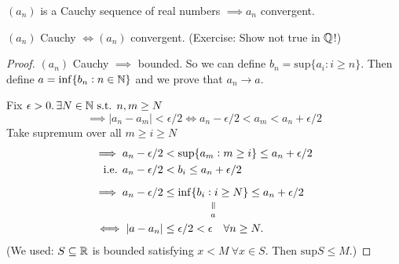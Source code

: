 \documentclass[10pt,twoside]{scrartcl}
\begin{document}
\begin{theorem}
$(a_n)$ is a Cauchy sequence of real numbers $\implies a_n$ convergent. 
\end{theorem}\vspace*{5pt}

\begin{corollary}
$(a_n)$ Cauchy $\iff (a_n)$ convergent. (Exercise: Show not true in $\mathbb{Q}$!) 	
\end{corollary}

\begin{proof}
$(a_n)$ Cauchy $\implies$ bounded. So we can define $b_n = \mathrm{sup}\{a_i : i \geq n\}$. Then define $a = \mathrm{inf}\{b_n : n \in\mathbb{N}\}$ and we prove that $a_n \to a$.

Fix $\epsilon > 0.\, \exists N \in\mathbb{N}\text{ s.t. }n,m \geq N$ 
\[\implies|a_n - a_m| < \epsilon/2 \iff a_n - \epsilon/2 < a_m < a_n + \epsilon /2\]
Take supremum over all $m \geq i \geq N$
\begin{align*}
\implies a_n - \epsilon/2 &< \mathrm{sup}	\{a_m: m \geq i\} \leq a_n + \epsilon/2\\
\text{ i.e. } a_n - \epsilon/2 &< b_i \leq a_n + \epsilon/2\\[.2cm]
\implies a_n - \epsilon/2 &\leq \equalto{\mathrm{inf}	\{b_i: i \geq N\}}{a} \leq a_n + \epsilon/2\\
\iff |a-a_n| &\leq \epsilon/2 < \epsilon \quad \forall n \geq N.
\end{align*}
(We used: $S \subseteq \mathbb{R}$ is bounded satisfying $x < M~\forall x \in S$. Then $\mathrm{sup}S \leq M$.)
\end{proof}\vspace*{10pt}

\end{document}
